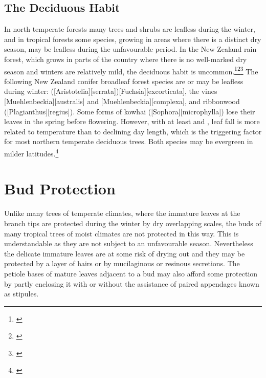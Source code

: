 \subsection{The Deciduous Habit}

In north temperate forests many trees and shrubs are leafless during the winter, and in tropical forests some species, growing in areas where there is a distinct dry season, may be leafless during the unfavourable period.
In the New Zealand rain forest, which grows in parts of the country where there is no well-marked dry season and winters are relatively mild, the deciduous habit is uncommon.\footnote{\cite{bussell1968growth}}\footnote{\cite{bussell1968effects}}\footnote{\cite{russel1936mechanism}} The following New Zealand conifer broadleaf forest species are or may be leafless during winter:  ([Aristotelia][serrata])[Fuchsia][excorticata], the vines [Muehlenbeckia][australis] and [Muehlenbeckia][complexa], and ribbonwood ([Plagianthus][regius]).
Some forms of kowhai ([Sophora][microphylla]) lose their leaves in the spring before flowering.
However, with at least  and , leaf fall is more related to temperature than to declining day length, which is the triggering factor for most northern temperate deciduous trees.
Both species may be evergreen in milder latitudes.\footnote{\cite{cockayne1928vegetation}}

\section{Bud Protection}

Unlike many trees of temperate climates, where the immature leaves at the branch tips are protected during the winter by dry overlapping scales, the buds of many tropical trees of moist climates are not protected in this way.
This is understandable as they are not subject to an unfavourable season.
Nevertheless the delicate immature leaves are at some risk of drying out and they may be protected by a layer of hairs or by mucilaginous or resinous secretions.
The petiole bases of mature leaves adjacent to a bud may also afford some protection by partly enclosing it with or without the assistance of paired appendages known as stipules.

